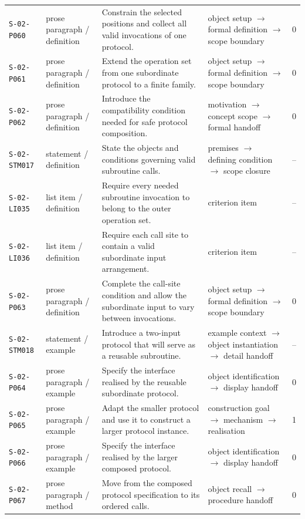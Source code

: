 \documentclass[10pt]{article}
\begin{document}
\begin{longtable}{@{}p{}p{}p{}p{}p{}@{}}
\texttt{S-02-P060}&prose paragraph / definition&Constrain the selected positions and collect all valid invocations of one protocol.&object setup $\rightarrow$ formal definition $\rightarrow$ scope boundary&0\\
\texttt{S-02-P061}&prose paragraph / definition&Extend the operation set from one subordinate protocol to a finite family.&object setup $\rightarrow$ formal definition $\rightarrow$ scope boundary&0\\
\texttt{S-02-P062}&prose paragraph / definition&Introduce the compatibility condition needed for safe protocol composition.&motivation $\rightarrow$ concept scope $\rightarrow$ formal handoff&0\\
\texttt{S-02-STM017}&statement / definition&State the objects and conditions governing valid subroutine calls.&premises $\rightarrow$ defining condition $\rightarrow$ scope closure&--\\
\texttt{S-02-LI035}&list item / definition&Require every needed subroutine invocation to belong to the outer operation set.&criterion item&--\\
\texttt{S-02-LI036}&list item / definition&Require each call site to contain a valid subordinate input arrangement.&criterion item&--\\
\texttt{S-02-P063}&prose paragraph / definition&Complete the call-site condition and allow the subordinate input to vary between invocations.&object setup $\rightarrow$ formal definition $\rightarrow$ scope boundary&0\\
\texttt{S-02-STM018}&statement / example&Introduce a two-input protocol that will serve as a reusable subroutine.&example context $\rightarrow$ object instantiation $\rightarrow$ detail handoff&--\\
\texttt{S-02-P064}&prose paragraph / example&Specify the interface realised by the reusable subordinate protocol.&object identification $\rightarrow$ display handoff&0\\
\texttt{S-02-P065}&prose paragraph / example&Adapt the smaller protocol and use it to construct a larger protocol instance.&construction goal $\rightarrow$ mechanism $\rightarrow$ realisation&1\\
\texttt{S-02-P066}&prose paragraph / example&Specify the interface realised by the larger composed protocol.&object identification $\rightarrow$ display handoff&0\\
\texttt{S-02-P067}&prose paragraph / method&Move from the composed protocol specification to its ordered calls.&object recall $\rightarrow$ procedure handoff&0\\

\end{longtable}
\end{document}
